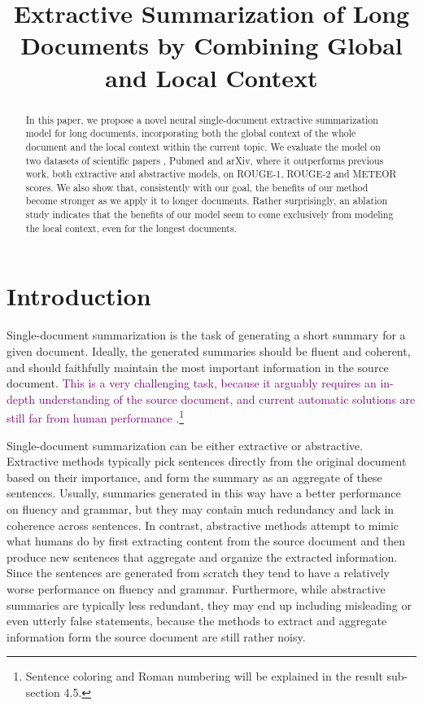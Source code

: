 \title{Extractive Summarization of Long Documents by Combining Global and Local Context}



\maketitle
\begin{abstract}
In this paper, we propose a novel neural single-document extractive summarization model for long documents, incorporating both the global context of the whole document and the local context within the current topic. We evaluate the model on two datasets of scientific papers , Pubmed and arXiv, where it outperforms previous work, both extractive and abstractive models, on ROUGE-1, ROUGE-2 and METEOR scores. We also show that, consistently with our goal, the benefits of our method become stronger as we apply it to longer documents.
Rather surprisingly, an ablation study indicates that the benefits of our model seem to come exclusively from modeling the local context, even for the longest documents.
\end{abstract}

\section{Introduction}
\renewcommand{\thefootnote}{\Roman{footnote}}
Single-document summarization is the task of generating a short summary for a given document. Ideally, the generated summaries should be fluent and coherent, and should faithfully maintain the most important information in the source document. \textcolor{purple}{This is a very challenging task, because it arguably requires an in-depth understanding of the source document, and current automatic solutions are still far from human performance} \cite{survey}.\footnote[7]{Sentence coloring and Roman
numbering will be explained in the result sub-section 4.5.}

Single-document summarization can be either extractive or abstractive. Extractive methods typically pick sentences directly from the original document based on their importance, and form the summary as an aggregate of these sentences. Usually, summaries generated in this way have a better performance on fluency and grammar, but they may contain much redundancy and lack in coherence across sentences. In contrast, abstractive methods attempt to mimic what humans do by first extracting content from the source document and then produce new sentences that aggregate and organize the extracted information. Since the sentences are generated from scratch they tend to have a relatively worse performance on fluency and grammar. Furthermore, while abstractive summaries are typically less redundant,  they may end up including misleading or even utterly false statements, because the methods to extract and aggregate information form the source document are still rather noisy. 

